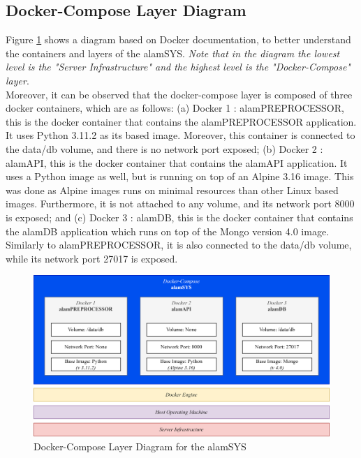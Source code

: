 \subsection{Docker-Compose Layer Diagram}
\label{subsec:docker_compose_diagram}
Figure \ref{fig:docker_compose_layout} shows a diagram based
on Docker documentation, to better understand the containers and layers
of the alamSYS. \textit{Note that in the diagram the lowest level is the "Server Infrastructure"
and the highest level is the "Docker-Compose" layer}.
\\

Moreover, it can be observed that the docker-compose layer is composed
of three docker containers, which are as follows:
(a) Docker 1 : alamPREPROCESSOR, this is the docker container that contains
the alamPREPROCESSOR application. It uses Python 3.11.2 as its based image. Moreover,
this container is connected to the data/db volume, and there is no network port exposed;
(b) Docker 2 : alamAPI, this is the docker container that contains the alamAPI
application. It uses a Python image as well, but is running on top of an Alpine 3.16 image.
This was done as Alpine images runs on minimal resources than other Linux based images.
Furthermore, it is not attached to any volume, and its network port
8000 is exposed; and
(c) Docker 3 : alamDB, this is the docker container that contains the alamDB application
which runs on top of the Mongo version 4.0 image. Similarly to alamPREPROCESSOR, it is also 
connected to the data/db volume, while its network port 27017 is exposed.

\begin{figure}[ht]
    \centering
    \includegraphics[width=1\textwidth]{./assets/Chapter_3/Docker-Compose Layout.png}
    \caption{Docker-Compose Layer Diagram for the alamSYS}
    \label{fig:docker_compose_layout}
\end{figure}
\FloatBarrier